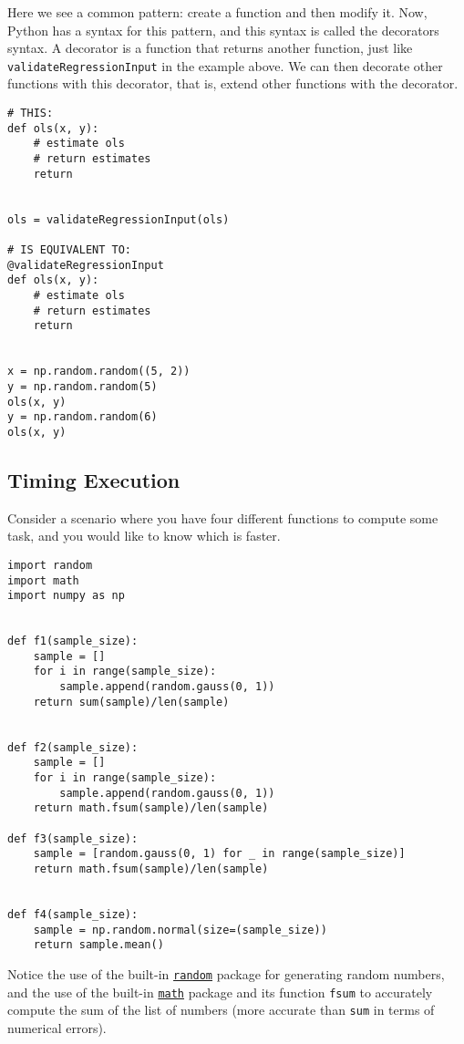 \documentclass[12pt, a4paper]{article}
\begin{document}
Here we see a common pattern: create a function and then modify it.
Now, Python has a syntax for this pattern, and this syntax is called the decorators syntax.
A decorator is a function that returns another function, just like \texttt{validateRegressionInput} in the example above.
We can then decorate other functions with this decorator, that is, extend other functions with the decorator.

\lstset{language=jupyter-python,label= ,caption= ,captionpos=b,numbers=none}
\begin{lstlisting}
# THIS:
def ols(x, y):
    # estimate ols
    # return estimates
    return


ols = validateRegressionInput(ols)

# IS EQUIVALENT TO:
@validateRegressionInput
def ols(x, y):
    # estimate ols
    # return estimates
    return


x = np.random.random((5, 2))
y = np.random.random(5)
ols(x, y)
y = np.random.random(6)
ols(x, y)
\end{lstlisting}

\subsection{Timing Execution}
\label{sec:orgf8497f3}
Consider a scenario where you have four different functions to compute some task, and you would like to know which is faster.
\lstset{language=jupyter-python,label= ,caption= ,captionpos=b,numbers=none}
\begin{lstlisting}
import random
import math
import numpy as np


def f1(sample_size):
    sample = []
    for i in range(sample_size):
        sample.append(random.gauss(0, 1))
    return sum(sample)/len(sample)


def f2(sample_size):
    sample = []
    for i in range(sample_size):
        sample.append(random.gauss(0, 1))
    return math.fsum(sample)/len(sample)

def f3(sample_size):
    sample = [random.gauss(0, 1) for _ in range(sample_size)]
    return math.fsum(sample)/len(sample)


def f4(sample_size):
    sample = np.random.normal(size=(sample_size))
    return sample.mean()
\end{lstlisting}
Notice the use of the built-in \href{https://docs.python.org/3/library/random.html}{\texttt{random}} package for generating random numbers, and the use of the built-in \href{https://docs.python.org/3/library/math.html}{\texttt{math}} package and its function \texttt{fsum} to accurately compute the sum of the list of numbers (more accurate than \texttt{sum} in terms of numerical errors).
\end{document}
